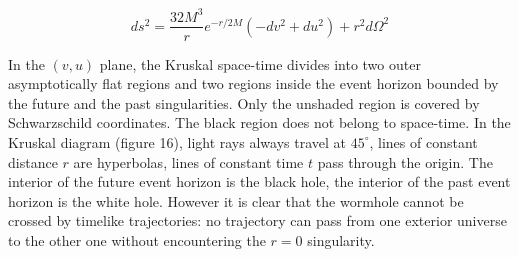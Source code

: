 \documentclass[12pt]{article}
\begin{document}
\begin{equation}
        ds^{2} = \frac{32M^3}{r} e^{-r/2M}(-dv^{2} + du^{2})+ 
        r^{2}d\Omega^{2}
        \label{luminet:14}
\end{equation}

In the $(v,u)$ plane, the Kruskal space-time divides into two outer 
asymptotically flat regions and two regions inside the event horizon 
bounded by the future and the past singularities. Only the unshaded 
region is covered by Schwarzschild coordinates. The black region does 
not belong to space-time. In the Kruskal 
diagram (figure 16), light rays  always travel at $45^{\circ}$, lines of 
constant distance $r$ are hyperbolas, lines of constant time $t$ pass 
through the origin. The interior of the 
future event horizon is the black hole, the interior of the past event 
horizon is the white hole. However it is clear that the wormhole 
cannot be crossed by timelike trajectories: no trajectory 
can pass from one exterior universe to the other one without 
encountering the $r=0$ singularity. 
\end{document}
